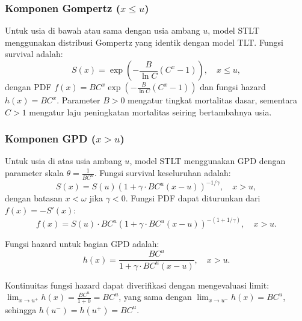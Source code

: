 \subsubsection{Komponen Gompertz ($x \leq u$)}

Untuk usia di bawah atau sama dengan usia ambang $u$, model STLT menggunakan distribusi Gompertz yang identik dengan model TLT. Fungsi survival adalah:
\begin{equation}
S(x) = \exp\left(-\frac{B}{\ln C}(C^x - 1)\right), \quad x \leq u,
\label{eq:stlt_gompertz_survival}
\end{equation}
dengan PDF $f(x) = BC^x \exp\left(-\frac{B}{\ln C}(C^x - 1)\right)$ dan fungsi hazard $h(x) = BC^x$. Parameter $B > 0$ mengatur tingkat mortalitas dasar, sementara $C > 1$ mengatur laju peningkatan mortalitas seiring bertambahnya usia.

\subsubsection{Komponen GPD ($x > u$)}

Untuk usia di atas usia ambang $u$, model STLT menggunakan GPD dengan parameter skala $\theta = \frac{1}{BC^u}$. Fungsi survival keseluruhan adalah:
\begin{equation}
S(x) = S(u) \left(1 + \gamma \cdot BC^u(x-u)\right)^{-1/\gamma}, \quad x > u,
\label{eq:stlt_gpd_survival}
\end{equation}
dengan batasan $x < \omega$ jika $\gamma < 0$. Fungsi PDF dapat diturunkan dari $f(x) = -S'(x)$:
\begin{equation}
f(x) = S(u) \cdot BC^u \left(1 + \gamma \cdot BC^u(x-u)\right)^{-(1+1/\gamma)}, \quad x > u.
\label{eq:stlt_gpd_pdf}
\end{equation}

Fungsi hazard untuk bagian GPD adalah:
\begin{equation}
h(x) = \frac{BC^u}{1 + \gamma \cdot BC^u(x-u)}, \quad x > u.
\label{eq:stlt_gpd_hazard}
\end{equation}

Kontinuitas fungsi hazard dapat diverifikasi dengan mengevaluasi limit: $\lim_{x \to u^+} h(x) = \frac{BC^u}{1 + 0} = BC^u$, yang sama dengan $\lim_{x \to u^-} h(x) = BC^u$, sehingga $h(u^-) = h(u^+) = BC^u$.

